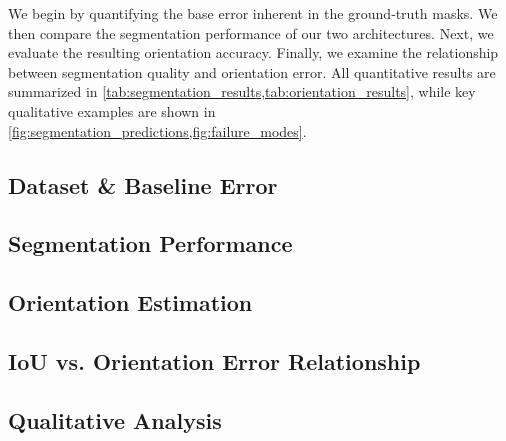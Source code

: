 We begin by quantifying the base error inherent in the ground‑truth masks.
We then compare the segmentation performance of our two architectures.
Next, we evaluate the resulting orientation accuracy.
Finally, we examine the relationship between segmentation quality and orientation error.
All quantitative results are summarized in \cref{tab:segmentation_results,tab:orientation_results}, while key qualitative examples are shown in \cref{fig:segmentation_predictions,fig:failure_modes}.

\subsection{Dataset \& Baseline Error}
\label{subsec:baseline-error}


\subsection{Segmentation Performance}
\label{subsec:segmentation-performance}


\subsection{Orientation Estimation}
\label{subsec:orientation-estimation}


\subsection{IoU vs. Orientation Error Relationship}
\label{subsec:correlation}


\subsection{Qualitative Analysis}
\label{subsec:qualitative-analysis}
